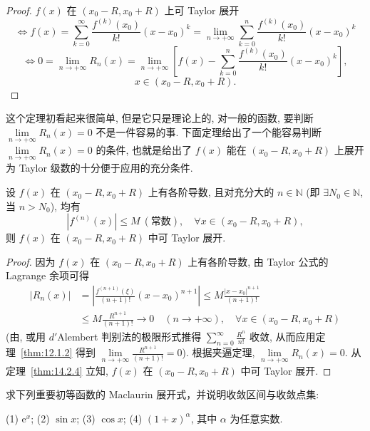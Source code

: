 \begin{proof}
$f(x)$ 在 $(x_{0}-R,x_{0}+R)$ 上可 Taylor 展开
\[
  \Leftrightarrow f(x)=\sum_{k=0}^{\infty}\frac{f^{(k)}(x_{0})}{k!}(x-x_{0})^{k}=\lim_{n\rightarrow+\infty}\sum_{k=0}^{n}\frac{f^{(k)}(x_{0})}{k!}(x-x_{0})^{k}
\]
\[
  \Leftrightarrow0=\lim_{n\rightarrow+\infty}R_{n}(x)=\lim_{n\rightarrow+\infty}\left[f(x)-\sum_{k=0}^{n}\frac{f^{(k)}(x_{0})}{k!}(x-x_{0})^{k}\right],
\]
\[
  x\in(x_{0}-R,x_{0}+R).
\]
\qedhere
\end{proof}

这个定理初看起来很简单, 但是它只是理论上的, 对一般的函数, 要判断 $\lim\limits_{n\to+\infty}R_{n}(x)=0$ 不是一件容易的事. 下面定理给出了一个能容易判断 $\lim\limits_{n\to+\infty}R_{n}(x)=0$ 的条件, 也就是给出了 $f(x)$ 能在 $(x_{0}-R,x_{0}+R)$ 上展开为 Taylor 级数的十分便于应用的充分条件.

\begin{theorem}\label{thm:14.2.5}
设 $f(x)$ 在 $(x_{0}-R,x_{0}+R)$ 上有各阶导数, 且对充分大的 $n\in\mathbb{N}$ (即 $\exists N_{0}\in\mathbb{N}$, 当 $n>N_{0}$), 均有
\[
  |f^{(n)}(x)|\leqslant M\ (\text{常数}),\quad\forall x\in(x_{0}-R,x_{0}+R),
\]
则 $f(x)$ 在 $(x_{0}-R,x_{0}+R)$ 中可 Taylor 展开.
\end{theorem}

\begin{proof}
因为 $f(x)$ 在 $(x_{0}-R,x_{0}+R)$ 上有各阶导数, 由 Taylor 公式的 Lagrange 余项可得
\[
  \begin{aligned}
    |R_{n}(x)|&=\left|\frac{f^{(n+1)}(\xi)}{(n+1)!}(x-x_{0})^{n+1}\right|\leqslant M\frac{|x-x_{0}|^{n+1}}{(n+1)!}\\
    &\leqslant M\frac{R^{n+1}}{(n+1)!}\to0\quad(n\to+\infty),\quad\forall x\in(x_{0}-R,x_{0}+R)
  \end{aligned}
\]
(由, 或用 $d'$Alembert 判别法的极限形式推得 $\sum_{n=0}^{\infty}\frac{R^{n}}{n!}$ 收敛, 从而应用定理~\ref{thm:12.1.2} 得到 $\lim\limits_{n\to+\infty}\frac{R^{n+1}}{(n+1)!}=0$). 根据夹逼定理, $\lim\limits_{n\to+\infty}R_{n}(x)=0$. 从定理~\ref{thm:14.2.4} 立知, $f(x)$ 在 $(x_{0}-R,x_{0}+R)$ 中可 Taylor 展开.
\end{proof}

\begin{example}\label{ex:14.2.3}
求下列重要初等函数的 Maclaurin 展开式，并说明收敛区间与收敛点集:

(1) $\mathrm{e}^{x}$; (2) $\sin x$; (3) $\cos x$; (4) $(1+x)^{\alpha}$, 其中 $\alpha$ 为任意实数.
\end{example}

